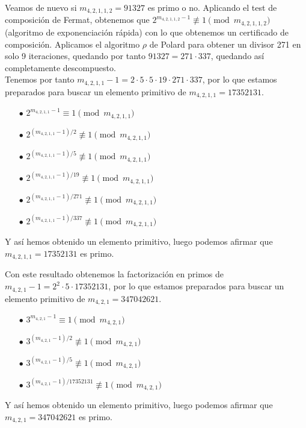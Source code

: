 \documentclass[fleqn]{article}
\begin{document}
    Veamos de nuevo si $m_{4,2,1,1,2} = 91327$ es primo o no. Aplicando el test de composición de Fermat, obtenemos que
    $2^{m_{4,2,1,1,2} -1} \not\equiv 1 \pmod{m_{4,2,1,1,2}}$ (algoritmo de exponenciación rápida) con lo que obtenemos un certificado de composición.
    Aplicamos el algoritmo $\rho$ de Polard para obtener un divisor 271 en solo 9 iteraciones, quedando por tanto $91327 = 271 \cdot 337$, quedando así completamente 
    descompuesto.\\ 
    
    Tenemos por tanto $m_{4,2,1,1} - 1 = 2 \cdot 5 \cdot 5 \cdot 19 \cdot 271 \cdot 337$, por lo que estamos preparados para buscar un elemento primitivo de $m_{4,2,1,1} = 17352131$.
    \begin{enumerate}
        \item[$\bullet$] $2^{m_{4,2,1,1} -1} \equiv 1 \pmod{m_{4,2,1,1}}$
        \item[$\bullet$] $2^{(m_{4,2,1,1} -1)/2} \not\equiv 1 \pmod{m_{4,2,1,1}}$
        \item[$\bullet$] $2^{(m_{4,2,1,1} -1)/5} \not\equiv 1 \pmod{m_{4,2,1,1}}$
        \item[$\bullet$] $2^{(m_{4,2,1,1} -1)/19} \not\equiv 1 \pmod{m_{4,2,1,1}}$
        \item[$\bullet$] $2^{(m_{4,2,1,1} -1)/271} \not\equiv 1 \pmod{m_{4,2,1,1}}$
        \item[$\bullet$] $2^{(m_{4,2,1,1} -1)/337} \not\equiv 1 \pmod{m_{4,2,1,1}}$
    \end{enumerate}
    Y así hemos obtenido un elemento primitivo, luego podemos afirmar que $m_{4,2,1,1} = 17352131$ es primo.

    Con este resultado obtenemos la factorización en primos de $m_{4,2,1} - 1 = 2^2 \cdot 5 \cdot 17352131$, por lo que estamos preparados para buscar un elemento primitivo de $m_{4,2,1} = 347042621$.
    \begin{enumerate}
        \item[$\bullet$] $3^{m_{4,2,1} -1} \equiv 1 \pmod{m_{4,2,1}}$
        \item[$\bullet$] $3^{(m_{4,2,1} -1)/2} \not\equiv 1 \pmod{m_{4,2,1}}$
        \item[$\bullet$] $3^{(m_{4,2,1} -1)/5} \not\equiv 1 \pmod{m_{4,2,1}}$ 
        \item[$\bullet$] $3^{(m_{4,2,1} -1)/17352131} \not\equiv 1 \pmod{m_{4,2,1}}$
    \end{enumerate}
    Y así hemos obtenido un elemento primitivo, luego podemos afirmar que $m_{4,2,1} = 347042621$ es primo.
\end{document}
